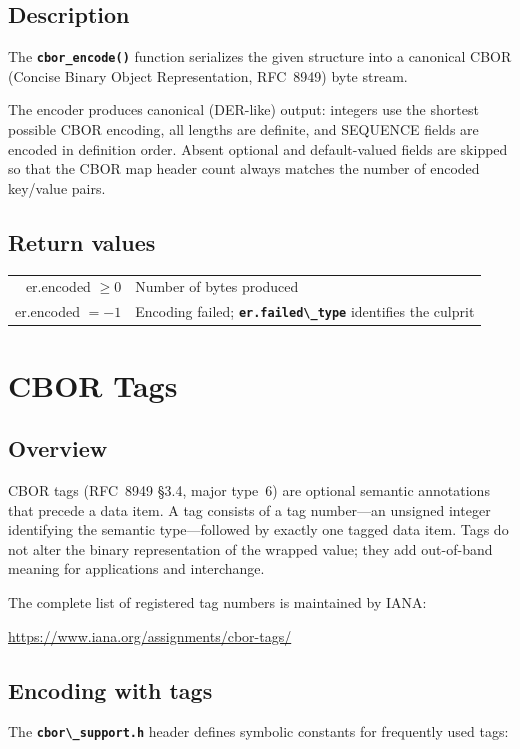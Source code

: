 \documentclass[english,oneside,12pt]{book}
\newcommand{\apisection}[2]{\clearpage\section{\label{#1}#2}}
\newcommand{\code}[1]{\texttt{\textbf{\lstinline{#1}}}}
\begin{document}
\subsection*{Description}

The \code{cbor_encode()} function serializes the given structure into a
canonical CBOR (Concise Binary Object Representation, RFC~8949) byte stream.

The encoder produces canonical (DER-like) output: integers use the shortest
possible CBOR encoding, all lengths are definite, and SEQUENCE fields are
encoded in definition order. Absent optional and default-valued fields are
skipped so that the CBOR map header count always matches the number of encoded
key/value pairs.

\subsection*{Return values}

\begin{tabular}[h!]{rl}
er.encoded $\geq 0$ & Number of bytes produced \\
er.encoded $= -1$ & Encoding failed; \code{er.failed\_type} identifies the culprit
\end{tabular}

\apisection{sec:cbor_tags}{CBOR Tags}

\subsection*{Overview}

CBOR tags (RFC~8949 \S3.4, major type~6) are optional semantic annotations
that precede a data item.  A tag consists of a tag number---an unsigned
integer identifying the semantic type---followed by exactly one tagged
data item.  Tags do not alter the binary representation of the wrapped
value; they add out-of-band meaning for applications and interchange.

The complete list of registered tag numbers is maintained by IANA:
\begin{center}
\url{https://www.iana.org/assignments/cbor-tags/}
\end{center}

\subsection*{Encoding with tags}

The \code{cbor\_support.h} header defines symbolic constants for frequently
used tags:
\end{document}

